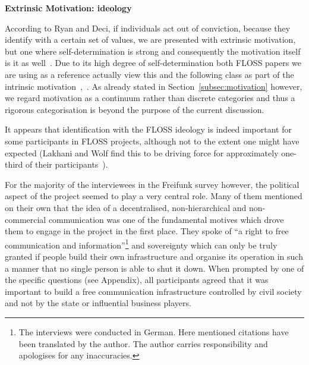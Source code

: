 \documentclass{scrartcl}
\begin{document}

\textbf{Extrinsic Motivation: ideology}

According to Ryan and Deci, if individuals act out of conviction, because they identify with a certain set of values, we are presented with extrinsic motivation, but one where self-determination is strong and consequently the motivation itself is it as well~\cite{RyDe2000}.
Due to its high degree of self-determination both FLOSS papers we are using as a reference actually view this and the following class as part of the intrinsic motivation~\cite{LakWo2005},~\cite{HarOu2002}.
As already stated in Section~\ref{subsec:motivation} however, we regard motivation as a continuum rather than discrete categories and thus a rigorous categorisation is beyond the purpose of the current discussion.

It appears that identification with the FLOSS ideology is indeed important for some participants in FLOSS projects, although not to the extent one might have expected (Lakhani and Wolf find this to be driving force for approximately one-third of their participants~\cite{LakWo2005}).

For the majority of the interviewees in the Freifunk survey however, the political aspect of the project seemed to play a very central role.
Many of them mentioned on their own that the idea of a decentralised, non-hierarchical and non-commercial communication was one of the fundamental motives which drove them to engage in the project in the first place.
They spoke of ``a right to free communication and information''\footnote{The interviews were conducted in German. Here mentioned citations have been translated by the author. The author carries responsibility and apologises for any inaccuracies.}
and sovereignty which can only be truly granted if people build their own infrastructure and organise its operation in such a manner that no single person is able to shut it down.
When prompted by one of the specific questions (see Appendix), all participants agreed that it was important to build a free communication infrastructure controlled by civil society and not by the state or influential business players.
\end{document}
